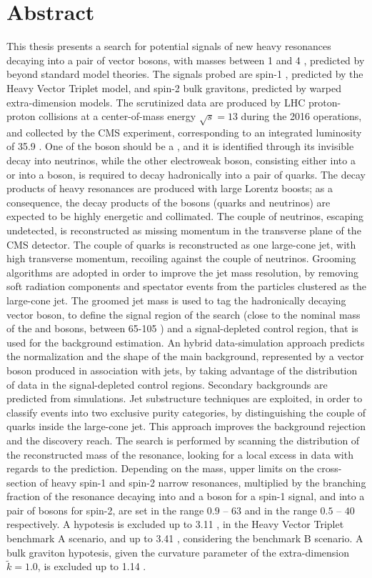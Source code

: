 \chapter*{Abstract}
\label{ch:abstract}

This thesis presents a search for potential signals of new heavy resonances decaying into a pair of vector bosons, with masses between 1 \TeV and 4 \TeV, predicted by beyond standard model theories. The signals probed are spin-1 \Wp, predicted by the Heavy Vector Triplet model, and spin-2 bulk gravitons, predicted by warped extra-dimension models. The scrutinized data are produced by LHC proton-proton collisions at a center-of-mass energy $\sqrt{s}=13$ \TeV during the 2016 operations, and collected by the CMS experiment, corresponding to an integrated luminosity of 35.9 \fbinv. One of the boson should be a \Z, and it is identified through its invisible decay into neutrinos, while the other electroweak boson, consisting either into a \W or into a \Z boson, is required to decay hadronically into a pair of quarks. The decay products of heavy resonances are produced with large Lorentz boosts; as a consequence, the decay products of the bosons (quarks and neutrinos) are expected to be highly energetic and collimated. The couple of neutrinos, escaping undetected, is reconstructed as missing momentum in the transverse plane of the CMS detector. The couple of quarks is reconstructed as one large-cone jet, with high transverse momentum, recoiling against the couple of neutrinos. Grooming algorithms are adopted in order to improve the jet mass resolution, by removing soft radiation components and spectator events from the particles clustered as the large-cone jet. The groomed jet mass is used to tag the hadronically decaying vector boson, to define the signal region of the search (close to the nominal mass of the \W and \Z bosons, between 65-105 \GeV) and a signal-depleted control region, that is used for the background estimation. An hybrid data-simulation approach predicts the normalization and the shape of the main background, represented by a vector boson produced in association with jets, by taking advantage of the distribution of data in the signal-depleted control regions. Secondary backgrounds are predicted from simulations. Jet substructure techniques are exploited, in order to classify events into two exclusive purity categories, by distinguishing the couple of quarks inside the large-cone jet. This approach improves the background rejection and the discovery reach. The search is performed by scanning the distribution of the reconstructed mass of the resonance, looking for a local excess in data with regards to the prediction. Depending on the mass, upper limits on the cross-section of heavy spin-1 and spin-2 narrow resonances, multiplied by the branching fraction of the resonance decaying into \Z and a \W boson for a spin-1 signal, and into a pair of \Z bosons for spin-2, are set in the range $0.9$ -- $63$ \fb and in the range $0.5$ -- $40$ \fb respectively. A \Wp hypotesis is excluded up to 3.11 \TeV, in the Heavy Vector Triplet benchmark A scenario, and up to 3.41 \TeV, considering the benchmark B scenario. A bulk graviton hypotesis, given the curvature parameter of the extra-dimension $\tilde{k}=1.0$, is excluded up to 1.14 \TeV.


\clearpage
